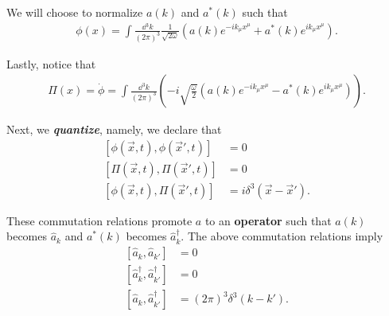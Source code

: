 \begin{note}
    We will choose to normalize $a\left( k \right) $ and $a^{*}\left( k \right) $ such that
    \begin{align}
        \phi \left( x \right) = \int \frac{\dd{^3k}}{\left( 2\pi \right)^3} \frac{1}{\sqrt{2 \omega} } \left( a \left( k \right) e^{-i k_\mu x^{\mu}} + a^{*}\left( k \right) e^{i k_\mu x^{\mu}} \right) 
    .\end{align}
\end{note}

Lastly, notice that
\begin{align}
    \Pi \left( x \right) = \dot{\phi} = \int \frac{\dd{^3k}}{\left( 2\pi \right)^3} \left( -i \sqrt{\frac{\omega}{2}} \left( a \left( k \right) e^{-i k_\mu x^{\mu}} - a^{*}\left( k \right) e^{i k_\mu x^{\mu}} \right) \right)   
.\end{align}

Next, we \textit{\textbf{quantize}}, namely, we declare that
\begin{align}
    \left[ \phi \left( \vec{x},t \right) , \phi \left( \vec{x}',t \right)  \right] &= 0 \\
    \left[ \Pi \left( \vec{x},t \right) , \Pi \left( \vec{x}',t \right)  \right] &= 0 \\
    \left[ \phi \left( \vec{x},t \right) , \Pi \left( \vec{x}', t \right)  \right] &= i \delta^{3} \left( \vec{x} - \vec{x}' \right) 
.\end{align}

\begin{claim}
    These commutation relations promote $a$ to an \textbf{operator} such that $a \left( k \right) $ becomes $\hat{a}_{k}$ and $a^{*} \left( k \right)$ becomes $\hat{a}_{k}^{\dag}$. The above commutation relations imply
\begin{align}
    \left[ \hat{a}_k, \hat{a}_{k'} \right] &= 0 \\ 
    \left[ \hat{a}_k^{\dag}, \hat{a}^{\dag}_{k'} \right] &= 0 \\
    \left[ \hat{a}_k, \hat{a}_{k'}^{\dag} \right] &= \left( 2\pi \right)^3 \delta^{3} \left( k - k' \right) 
.\end{align}
\end{claim}

